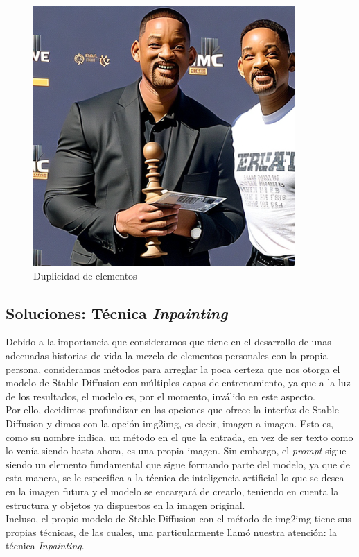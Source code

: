 \begin{itemize}
\begin{figure}[h]
	\centering
	\includegraphics[width = 0.5
	\textwidth]{Imagenes/Vectorial/duplicidad_will.png}
	\caption{Duplicidad de elementos}
	\label{fig:willpor2}
\end{figure}

\subsection{Soluciones: Técnica \textit{Inpainting}}

Debido a la importancia que consideramos que tiene en el desarrollo de unas adecuadas historias de vida la mezcla de elementos personales con la propia persona, consideramos métodos para arreglar la poca certeza que nos otorga el modelo de Stable Diffusion con múltiples capas de entrenamiento, ya que a la luz de los resultados, el modelo es, por el momento, inválido en este aspecto. \\

Por ello, decidimos profundizar en las opciones que ofrece la interfaz de Stable Diffusion y dimos con la opción img2img, es decir, imagen a imagen. Esto es, como su nombre indica, un método en el que la entrada, en vez de ser texto como lo venía siendo hasta ahora, es una propia imagen. Sin embargo, el \textit{prompt} sigue siendo un elemento fundamental que sigue formando parte del modelo, ya que de esta manera, se le especifica a la técnica de inteligencia artificial lo que se desea en la imagen futura y el modelo se encargará de crearlo, teniendo en cuenta la estructura y objetos ya dispuestos en la imagen original. \\

Incluso, el propio modelo de Stable Diffusion con el método de img2img tiene sus propias técnicas, de las cuales, una particularmente llamó nuestra atención: la técnica \textit{Inpainting}. \\


\end{itemize}
